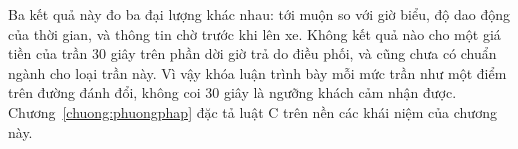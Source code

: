Ba kết quả này đo ba đại lượng khác nhau: tới muộn so với giờ biểu, độ dao động của thời gian, và thông tin chờ trước
khi lên xe. Không kết quả nào cho một giá tiền của trần 30 giây trên phần dời giờ trả do điều phối, và cũng chưa có
chuẩn ngành cho loại trần này. Vì vậy khóa luận trình bày mỗi mức trần như một điểm trên đường đánh đổi, không coi 30
giây là ngưỡng khách cảm nhận được. Chương~\ref{chuong:phuongphap} đặc tả luật C trên nền các khái niệm của chương này.
